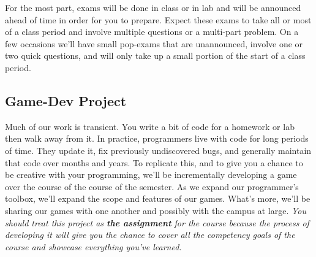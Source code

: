 \documentclass[10pt]{article}
\begin{document}
For the most part, exams will be done in class or in lab and will be announced ahead of time in order for you to prepare.  Expect these exams to take all or most of a class period and involve multiple questions or a multi-part problem. On a few occasions we'll have small pop-exams that are unannounced, involve one or two quick questions, and will only take up a small portion of the start of a class period.

\iffalse
\subsection*{Projects}

\textit{You should look at the projects like game day or the big performance. They are, in large part, what we're preparing for with other smaller assignments.} You should give them your best effort and a great deal of your time. You'll learn and grow the most as a programmer by really digging in and engaging in the projects and all of the challenges you'll face when working on them.

Projects are large scale programming assignments done over the course of two weeks. They will draw on everything you've done and learned in the class up to that point. They will also typically involve some new ideas that you must navigate and integrate into your work. Some lab and class time will be used to work on the projects, but you should plan for the bulk of your work on them to take place outside of class and lab.
\fi

\subsection*{Game-Dev Project}

Much of our work is transient. You write a bit of code for a homework or lab then walk away from it. In practice, programmers live with code for long periods of time. They update it, fix previously undiscovered bugs, and generally maintain that code over months and years.  To replicate this, and to give you a chance to be creative with your programming, we'll be incrementally developing a game over the course of the course of the semester.  As we expand our programmer's toolbox, we'll expand the scope and features of our games.  What's more, we'll be sharing our games with one another and possibly with the campus at large. \textit{You should treat this project as \textbf{the assignment} for the course because the process of developing it will give you the chance to cover all the competency goals of the course and showcase everything you've learned.}
\end{document}
